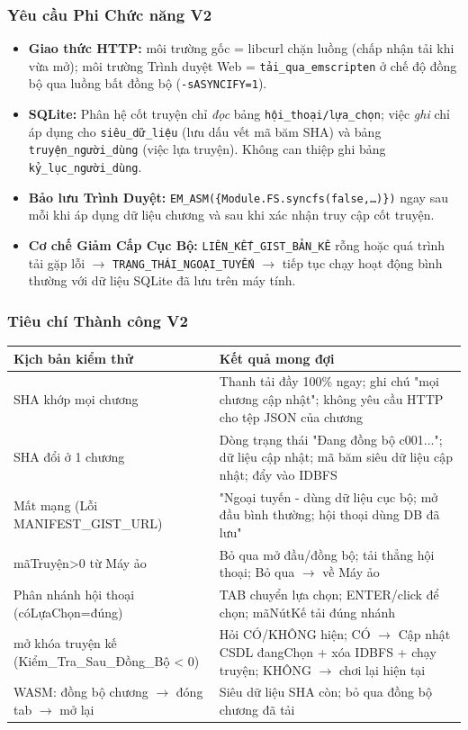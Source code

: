 \documentclass[12pt,a4paper]{article}
\begin{document}
\subsubsection{Yêu cầu Phi Chức năng V2}
\begin{itemize}[noitemsep, leftmargin=*]
    \item \textbf{Giao thức HTTP:} môi trường gốc = libcurl chặn luồng (chấp nhận tải khi vừa mở);
    môi trường Trình duyệt Web = \texttt{tải\_qua\_emscripten} ở chế độ đồng bộ qua luồng bất đồng bộ (\texttt{-sASYNCIFY=1}).
    \item \textbf{SQLite:} Phân hệ cốt truyện chỉ \emph{đọc} bảng \texttt{hội\_thoại/lựa\_chọn};
    việc \emph{ghi} chỉ áp dụng cho \texttt{siêu\_dữ\_liệu} (lưu dấu vết mã băm SHA) và bảng \texttt{truyện\_người\_dùng} (việc lựa truyện). Không can thiệp ghi bảng \texttt{kỷ\_lục\_người\_dùng}.
    \item \textbf{Bảo lưu Trình Duyệt:} \texttt{EM\_ASM(\{Module.FS.syncfs(false,\ldots)\})} ngay sau mỗi khi áp dụng dữ liệu chương và sau khi xác nhận truy cập cốt truyện.
    \item \textbf{Cơ chế Giảm Cấp Cục Bộ:} \texttt{LIÊN\_KẾT\_GIST\_BẢN\_KÊ} rỗng hoặc quá trình tải gặp lỗi $\rightarrow$ \texttt{TRẠNG\_THÁI\_NGOẠI\_TUYẾN} $\rightarrow$ tiếp tục chạy hoạt động bình thường với dữ liệu SQLite đã lưu trên máy tính.
\end{itemize}

\newpage
\subsubsection{Tiêu chí Thành công V2}
\begin{table}[H]
\centering
\begin{tabularx}{\linewidth}{|l|X|}
    \hline
    \textbf{Kịch bản kiểm thử} & \textbf{Kết quả mong đợi} \\
    \hline
    SHA khớp mọi chương & Thanh tải đầy 100\% ngay;
    ghi chú "mọi chương cập nhật"; không yêu cầu HTTP cho tệp JSON của chương \\
    \hline
    SHA đổi ở 1 chương & Dòng trạng thái "Đang đồng bộ c001...";
    dữ liệu cập nhật; mã băm siêu dữ liệu cập nhật; đẩy vào IDBFS \\
    \hline
    Mất mạng (Lỗi MANIFEST\_GIST\_URL) & "Ngoại tuyến - dùng dữ liệu cục bộ; mở đầu bình thường; hội thoại dùng DB đã lưu" \\
    \hline
    mãTruyện>0 từ Máy ảo & Bỏ qua mở đầu/đồng bộ;
    tải thẳng hội thoại; Bỏ qua $\rightarrow$ về Máy ảo \\
    \hline
    Phân nhánh hội thoại (cóLựaChọn=đúng) & TAB chuyển lựa chọn;
    ENTER/click để chọn; mãNútKế tải đúng nhánh \\
    \hline
    mở khóa truyện kế (Kiểm\_Tra\_Sau\_Đồng\_Bộ < 0) & Hỏi CÓ/KHÔNG hiện;
    CÓ $\rightarrow$ Cập nhật CSDL đangChọn + xóa IDBFS + chạy truyện;
    KHÔNG $\rightarrow$ chơi lại hiện tại \\
    \hline
    WASM: đồng bộ chương $\rightarrow$ đóng tab $\rightarrow$ mở lại & Siêu dữ liệu SHA còn;
    bỏ qua đồng bộ chương đã tải \\
    \hline
\end{tabularx}
\end{table}
\end{document}
